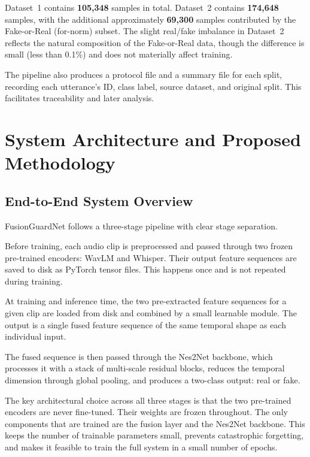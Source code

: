 \documentclass[11pt,a4paper]{article}
\begin{document}
Dataset~1 contains \textbf{105,348} samples in total. Dataset~2 contains
\textbf{174,648} samples, with the additional approximately \textbf{69,300}
samples contributed by the Fake-or-Real (for-norm) subset. The slight real/fake
imbalance in Dataset~2 reflects the natural composition of the Fake-or-Real data,
though the difference is small (less than 0.1\%) and does not materially affect
training.

The pipeline also produces a protocol file and a summary file for each split,
recording each utterance's ID, class label, source dataset, and original split.
This facilitates traceability and later analysis.

\section{System Architecture and Proposed Methodology}

\subsection{End-to-End System Overview}

FusionGuardNet follows a three-stage pipeline with clear stage separation.

Before training, each audio clip is preprocessed and passed through two frozen
pre-trained encoders: WavLM and Whisper. Their output feature sequences are saved
to disk as PyTorch tensor files. This happens once and is not repeated during
training.

At training and inference time, the two pre-extracted feature sequences for a
given clip are loaded from disk and combined by a small learnable module. The
output is a single fused feature sequence of the same temporal shape as each
individual input.

The fused sequence is then passed through the Nes2Net backbone, which processes
it with a stack of multi-scale residual blocks, reduces the temporal dimension
through global pooling, and produces a two-class output: real or fake.

The key architectural choice across all three stages is that the two pre-trained
encoders are never fine-tuned. Their weights are frozen throughout. The only
components that are trained are the fusion layer and the Nes2Net backbone. This
keeps the number of trainable parameters small, prevents catastrophic forgetting,
and makes it feasible to train the full system in a small number of epochs.
\end{document}
